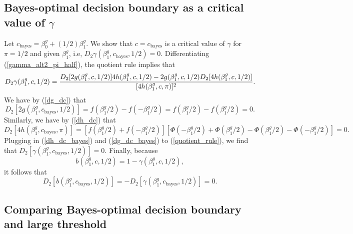 \documentclass[12pt]{article}
\begin{document}
\begin{appendices}
\begin{refsection}
		\subsection{Bayes-optimal decision boundary as a critical value of $\gamma$}\label{sec:bayes_opt}
		Let $c_\textrm{bayes} = \beta^g_0 + (1/2)\beta^g_1.$ We show that $c = c_\textrm{bayes}$ is a critical value of $\gamma$ for $\pi = 1/2$ and given $\beta^g_1$, i.e, $D_2 \gamma (\beta^g_1, c_\textrm{bayes}, 1/2) = 0.$ Differentiating (\ref{gamma_alt2_pi_half}), the quotient rule implies that
		\begin{equation}\label{quotient_rule}
		D_2\gamma(\beta^g_1, c, 1/2) \\ = \frac{D_2[2g(\beta^g_1, c, 1/2)] 4h(\beta^g_1, c, 1/2) - 2g(\beta^g_1, c, 1/2) D_2[4h(\beta^g_1, c, 1/2)]}{[4h(\beta^g_1, c, \pi)]^2}.
		\end{equation}
		We have by (\ref{dg_dc}) that
		\begin{equation}\label{dg_dc_bayes}
		D_2[2g(\beta^g_1, c_\textrm{bayes}, 1/2)] = f( \beta^g_1/2) - f( -\beta^g_1/2) = f(\beta^g_1/2) - f(\beta^g_1/2) = 0.
		\end{equation}
		Similarly, we have by (\ref{dh_dc}) that
		\begin{equation}\label{dh_dc_bayes}
		D_2[4 h(\beta^g_1, c_\textrm{bayes}, \pi)] = [f( \beta^g_1/2) + f( -\beta^g_1/2)] \left[  \Phi(-\beta^g_1/2) + \Phi(\beta^g_1/2) -  \Phi(\beta^g_1/2) - \Phi(-\beta^g_1/2) \right] = 0.
		\end{equation}
		Plugging in (\ref{dh_dc_bayes}) and (\ref{dg_dc_bayes}) to (\ref{quotient_rule}), we find that 
		$D_2[\gamma(\beta^g_1, c_\textrm{bayes}, 1/2)] = 0.$ Finally, because
		$$b(\beta^g_1, c, 1/2) = 1 - \gamma(\beta^g_1, c, 1/2),$$ it follows that
		$$D_2[b(\beta^g_1, c_\textrm{bayes}, 1/2)] = -D_2[\gamma(\beta^g_1, c_\textrm{bayes}, 1/2)] = 0.$$
		
		\subsection{Comparing Bayes-optimal decision boundary and large threshold}\label{sec:comparison}
		

\end{refsection}
\end{appendices}
\end{document}
